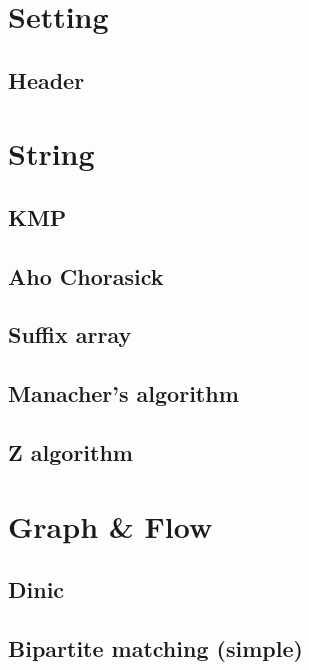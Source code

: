 \documentclass[10pt,landscape,a4paper,twocolumn]{article}
\begin{document}
\tableofcontents

\section{Setting}
\subsection{Header}



\section{String}
\subsection{KMP}
%

\subsection{Aho Chorasick}


\subsection{Suffix array}


\subsection{Manacher's algorithm}


\subsection{Z algorithm}



\section{Graph \& Flow}
\subsection{Dinic}


\subsection{Bipartite matching (simple)}

\end{document}

